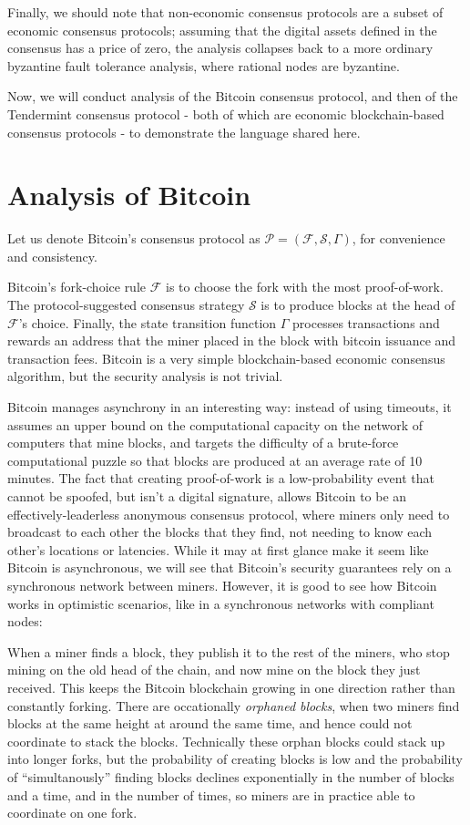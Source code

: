 \documentclass[11pt,a4paper]{article}
\theoremstyle{plain}
\theoremstyle{definition}
\begin{document}
Finally, we should note that non-economic consensus protocols are a subset of economic consensus protocols; assuming that the digital assets defined in the consensus has a price of zero, the analysis collapses back to a more ordinary byzantine fault tolerance analysis, where rational nodes are byzantine. 

Now, we will conduct analysis of the Bitcoin consensus protocol, and then of the Tendermint consensus protocol - both of which are economic blockchain-based consensus protocols - to demonstrate the language shared here.



\section{Analysis of Bitcoin}

Let us denote Bitcoin's consensus protocol as $\mathcal{P} = (\mathcal{F}, \mathcal{S}, \Gamma)$, for convenience and consistency. 

Bitcoin's fork-choice rule $\mathcal{F}$ is to choose the fork with the most proof-of-work. The protocol-suggested consensus strategy $\mathcal{S}$ is to produce blocks at the head of $\mathcal{F}$'s choice. Finally, the state transition function $\Gamma$ processes transactions and rewards an address that the miner placed in the block with bitcoin issuance and transaction fees. Bitcoin is a very simple blockchain-based economic consensus algorithm, but the security analysis is not trivial.

Bitcoin manages asynchrony in an interesting way: instead of using timeouts, it assumes an upper bound on the computational capacity on the network of computers that mine blocks, and targets the difficulty of a brute-force computational puzzle so that blocks are produced at an average rate of 10 minutes. The fact that creating proof-of-work is a low-probability event that cannot be spoofed, but isn't a digital signature, allows Bitcoin to be an effectively-leaderless anonymous consensus protocol, where miners only need to broadcast to each other the blocks that they find, not needing to know each other's locations or latencies. While it may at first glance make it seem like Bitcoin is asynchronous, we will see that Bitcoin's security guarantees rely on a synchronous network between miners. However, it is good to see how Bitcoin works in optimistic scenarios, like in a synchronous networks with compliant nodes:

When a miner finds a block, they publish it to the rest of the miners, who stop mining on the old head of the chain, and now mine on the block they just received. This keeps the Bitcoin blockchain growing in one direction rather than constantly forking. There are occationally \emph{orphaned blocks}, when two miners find blocks at the same height at around the same time, and hence could not coordinate to stack the blocks. Technically these orphan blocks could stack up into longer forks, but the probability of creating blocks is low and the probability of ``simultanously'' finding blocks declines exponentially in the number of blocks and a time, and in the number of times, so miners are in practice able to coordinate on one fork.
\end{document}
